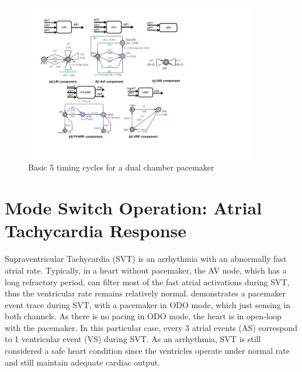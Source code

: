 \begin{figure}[!t]
\center
\includegraphics[width=0.9\textwidth]{figs/pacemaker.pdf}
\caption{Basic 5 timing cycles for a dual chamber pacemaker}
\label{fig:PMdesign}
\end{figure} 

\section{Mode Switch Operation: Atrial Tachycardia Response}
\label{Mode_switch}
Supraventricular Tachycardia (SVT) is an arrhythmia with an abnormally fast atrial rate. %
Typically, in a heart without pacemaker, the AV node, which has a long refractory period, can filter most of the fast atrial activations during SVT, thus the ventricular rate remains relatively normal.  demonstrates a pacemaker event trace during SVT, with a pacemaker in ODO mode, which just sensing in both channels. 
As there is no pacing in ODO mode, the heart is in open-loop with the pacemaker. In this particular case, every 3 atrial events (AS) correspond to 1 ventricular event (VS) during SVT. 
As an arrhythmia, SVT is still considered a safe heart condition since the ventricles operate under normal rate and still maintain adequate cardiac output. 

